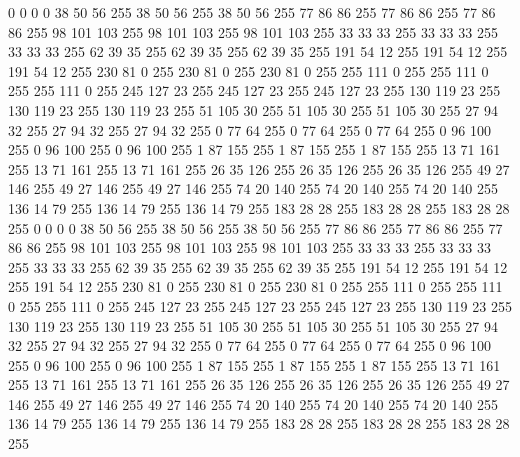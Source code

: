 0 0 0 0 38 50 56 255 38 50 56 255 38 50 56 255 77 86 86 255 77 86 86 255 77 86 86 255 98 101 103 255 98 101 103 255 98 101 103 255 33 33 33 255 33 33 33 255 33 33 33 255 62 39 35 255 62 39 35 255 62 39 35 255
191 54 12 255 191 54 12 255 191 54 12 255 230 81 0 255 230 81 0 255 230 81 0 255 255 111 0 255 255 111 0 255 255 111 0 255 245 127 23 255 245 127 23 255 245 127 23 255 130 119 23 255 130 119 23 255 130 119 23 255 51 105 30 255
51 105 30 255 51 105 30 255 27 94 32 255 27 94 32 255 27 94 32 255 0 77 64 255 0 77 64 255 0 77 64 255 0 96 100 255 0 96 100 255 0 96 100 255 1 87 155 255 1 87 155 255 1 87 155 255 13 71 161 255 13 71 161 255
13 71 161 255 26 35 126 255 26 35 126 255 26 35 126 255 49 27 146 255 49 27 146 255 49 27 146 255 74 20 140 255 74 20 140 255 74 20 140 255 136 14 79 255 136 14 79 255 136 14 79 255 183 28 28 255 183 28 28 255 183 28 28 255
0 0 0 0 38 50 56 255 38 50 56 255 38 50 56 255 77 86 86 255 77 86 86 255 77 86 86 255 98 101 103 255 98 101 103 255 98 101 103 255 33 33 33 255 33 33 33 255 33 33 33 255 62 39 35 255 62 39 35 255 62 39 35 255
191 54 12 255 191 54 12 255 191 54 12 255 230 81 0 255 230 81 0 255 230 81 0 255 255 111 0 255 255 111 0 255 255 111 0 255 245 127 23 255 245 127 23 255 245 127 23 255 130 119 23 255 130 119 23 255 130 119 23 255 51 105 30 255
51 105 30 255 51 105 30 255 27 94 32 255 27 94 32 255 27 94 32 255 0 77 64 255 0 77 64 255 0 77 64 255 0 96 100 255 0 96 100 255 0 96 100 255 1 87 155 255 1 87 155 255 1 87 155 255 13 71 161 255 13 71 161 255
13 71 161 255 26 35 126 255 26 35 126 255 26 35 126 255 49 27 146 255 49 27 146 255 49 27 146 255 74 20 140 255 74 20 140 255 74 20 140 255 136 14 79 255 136 14 79 255 136 14 79 255 183 28 28 255 183 28 28 255 183 28 28 255